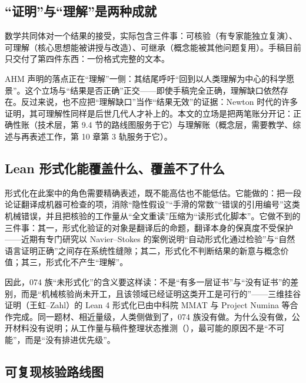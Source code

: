 \subsection{“证明”与“理解”是两种成就}

数学共同体对一个结果的接受，实际包含三件事：可核验（有专家能独立复演）、可理解（核心思想能被讲授与改造）、可继承（概念能被其他问题复用）。手稿目前只交付了第四件东西：一份格式完整的文本。

AHM 声明的落点正在“理解”一侧：其结尾呼吁“回到以人类理解为中心的科学愿景”。这个立场与“结果是否正确”正交——即使手稿完全正确，理解缺口依然存在。反过来说，也不应把“理解缺口”当作“结果无效”的证据：Newton 时代的许多证明，其可理解性同样是后世几代人才补上的。本文的立场是把两笔账分开记：正确性账（技术层，第 9.4 节的路线图服务于它）与理解账（概念层，需要教学、综述与再表述工作，第 10 章第 3 轨服务于它）。

\subsection{Lean 形式化能覆盖什么、覆盖不了什么}

形式化在此案中的角色需要精确表述，既不能高估也不能低估。它能做的：把一段论证翻译成机器可检查的项，消除“隐性假设”“手滑的常数”“错误的引用编号”这类机械错误，并且把核验的工作量从“全文重读”压缩为“读形式化脚本”。它做不到的三件事：其一，形式化验证的对象是翻译后的命题，翻译本身的保真度不受保护——近期有专门研究以 Navier--Stokes 的案例说明“自动形式化通过检验”与“自然语言证明正确”之间存在系统性缝隙；其二，形式化不判断结果的新意与概念价值；其三，形式化不产生“理解”。

因此，074 族“未形式化”的含义要这样读：不是“有多一层证书”与“没有证书”的差别，而是“机械核验尚未开工，且该领域已经证明这类开工是可行的”——三维挂谷证明（王虹--Zahl）的 Lean 4 形式化已由中科院 MMAT 与 Project Numina 等合作完成。同一题材、相近量级，人类侧做到了，074 族没有做。为什么没有做，公开材料没有说明；从工作量与稿件整理状态推测（\cfL），最可能的原因不是“不可能”，而是“没有排进优先级”。

\subsection{可复现核验路线图}


